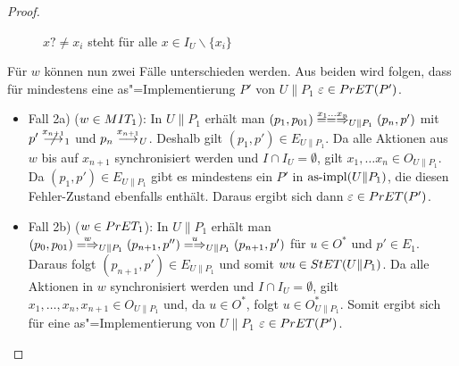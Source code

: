 \begin{proof}
\begin{itemize}
\begin{figure} [h!tbp]
\begin{center}
        \caption{$x?\neq x_i$ steht für alle $x\in I_U\backslash\{x_i\}$}
      \label{UohneE}
      \end{center}
      \end{figure}
      Für $w$ können nun zwei Fälle unterschieden werden. Aus beiden wird
      folgen, dass für mindestens eine as"=Implementierung $P'$ von $U\|P_1$
      $\varepsilon\in PrET(P')$.
      \begin{itemize}
        \item Fall 2a) ($w\in MIT _1$): In $U\|P_1$ erhält man $(p_1,p_{01})
          \lweakmay[x_1\dots x_n]_{U\|P_1} (p_n,p')$ mit $p'\nmust[x_{n+1}]_1$
          und $p_n\must[x_{n+1}]_U$. Deshalb gilt $(p_1,p')\in E_{U\|P_1}$. Da
          alle Aktionen aus $w$ bis auf $x_{n+1}$ synchronisiert werden und
          $I\cap I_U=\emptyset$, gilt $x_1,\dots x_n\in O_{U\|P_1}$. Da
          $(p_1,p')\in E_{U\|P_1}$ gibt es mindestens ein $P'$ in $\mathrm{as}\text{-}\mathrm{impl}
          (U\|P_1)$, die diesen Fehler-Zustand ebenfalls enthält. Daraus ergibt
          sich dann $\varepsilon\in PrET (P')$.
        \item Fall 2b) ($w\in PrET _1$): In $U\|P_1$ erhält man $(p_0,p_{01})
          \weakmay[w]_{U\|P_1}(p_{n+1},p'')\weakmay[u]_{U\|P_1}(p_{n+1},p')$
          für $u\in O^*$ und $p'\in E_1$. Daraus folgt $(p_{n+1},p')\in
          E_{U\|P_1}$ und somit $wu\in StET (U\|P_1)$. Da alle Aktionen in $w$
          synchronisiert werden und $I\cap I_U=\emptyset$, gilt $x_1,\dots
          ,x_n,x_{n+1}\in O_{U\|P_1}$ und, da $u\in O^*$, folgt $u\in
          O_{U\|P_1}^*$. Somit ergibt sich für eine as"=Implementierung von
          $U\|P_1$ $\varepsilon\in PrET (P')$.
      \end{itemize}

\end{itemize}
\end{proof}
